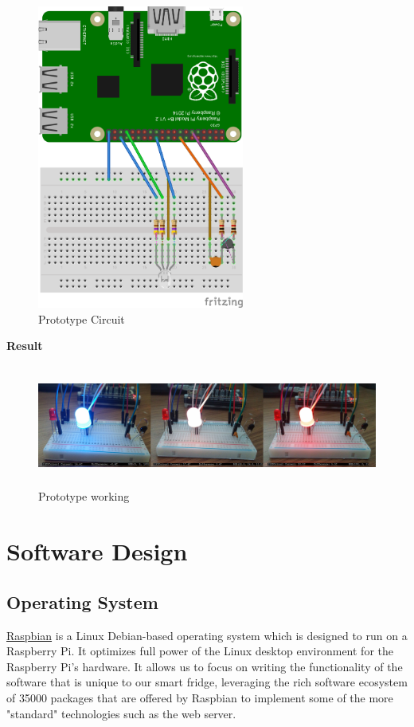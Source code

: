 \documentclass[10pt]{article}
\begin{document}
\begin{figure}[h]
\centering
\caption{Prototype Circuit}
\label{Prototype Circuit}
\includegraphics[height=10cm]{images/prototypeDiagram.png}
\end{figure}

\textbf{Result}
\begin{figure}[h]
\centering
\caption{Prototype working}
\label{Prototype working}
\includegraphics[height=4cm]{images/tempsenproto.png}
\end{figure}

\newpage
\section{Software Design}
\subsection{Operating System}
\hyperref[https://www.raspbian.org/]{Raspbian} is a Linux Debian-based operating system which is designed to run on a Raspberry Pi. It optimizes full power of the Linux desktop environment for the Raspberry Pi's hardware. It allows us to focus on writing the functionality of the software that is unique to our smart fridge, leveraging the rich software ecosystem of 35000 packages that are offered by Raspbian to implement some of the more "standard" technologies such as the web server.
\end{document}
